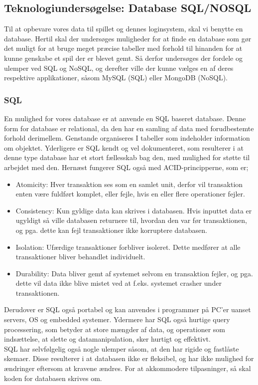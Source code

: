 \subsection{Teknologiundersøgelse: Database SQL/NOSQL}
Til at opbevare vores data til spillet og dennes loginsystem, skal vi benytte en database. Hertil skal der undersøges muligheder for at finde en database som gør det muligt for at bruge meget præcise tabeller med forhold til hinanden for at kunne genskabe et spil der er blevet gemt. Så derfor undersøges der fordele og ulemper ved SQL og NoSQL, og derefter ville der kunne vælges en af deres respektive applikationer, såsom MySQL (SQL) eller MongoDB (NoSQL).

\subsubsection{SQL}
En mulighed for vores database er at anvende en SQL baseret database. Denne form for database er relational, da den har en samling af data med forudbestemte forhold derimellem. Genstande organiseres I tabeller som indeholder information om objektet. Yderligere er SQL kendt og vel dokumenteret, som resulterer i at denne type database har et stort fællesskab bag den, med mulighed for støtte til arbejdet med den. Hernæst fungerer SQL også med ACID-principperne, som er; 

\begin{itemize}
\item Atomicity: Hver transaktion ses som en samlet unit, derfor vil transaktion enten være fuldført komplet, eller fejle, hvis en eller flere operationer fejler.
\item Consistency: Kun gyldige data kan skrives i databasen. Hvis inputtet data er ugyldigt så ville databasen returnere til, hvordan den var før transaktionen, og pga. dette kan fejl transaktioner ikke korruptere databasen.
\item Isolation: Ufærdige transaktioner forbliver isoleret. Dette medfører at alle transaktioner bliver behandlet individuelt.
\item Durability: Data bliver gemt af systemet selvom en transaktion fejler, og pga. dette vil data ikke blive mistet ved at f.eks. systemet crasher under transaktionen.
\end{itemize}
Derudover er SQL også portabel og kan anvendes i programmer på PC’er uanset servers, OS og embedded systemer. Ydermere har SQL også hurtige query processering, som betyder at store mængder af data, og operationer som indsættelse, at slette og datamanipulation, sker hurtigt og effektivt. \\
SQL har selvfølgelig også nogle ulemper såsom, at den har rigide og fastlåste skemaer. Disse resulterer i at databasen ikke er fleksibel, og har ikke mulighed for ændringer eftersom at kravene ændres. For at akkommodere tilpasninger, så skal koden for databasen skrives om.

